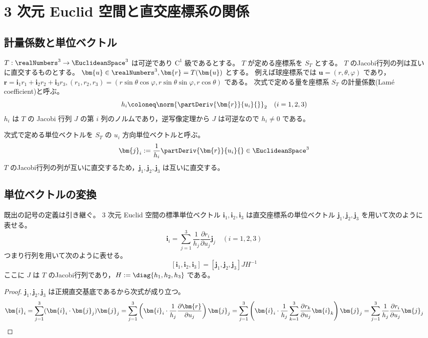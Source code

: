 \chapter{3 次元 Euclid 空間と直交座標系の関係}
    \section{計量係数と単位ベクトル}
        $T:\realNumbers^3\to\EuclideanSpace^3$ は可逆であり $\mathrm{C}^1$ 級であるとする。
        $T$ が定める座標系を $S_T$ とする。
        $T$ のJacobi行列の列は互いに直交するものとする。
        $\bm{u}\in\realNumbers^3,\bm{r} = T(\bm{u})$ とする。
        例えば球座標系では $\bm{u} = (r,\theta,\varphi)$ であり，$\bm{r} = \bm{i}_1 r_1 + \bm{i}_2 r_2 + \bm{i}_3 r_3,(r_1,r_2,r_3) = (r\sin\theta\cos\varphi,r\sin\theta\sin\varphi,r\cos\theta)$ である。
        次式で定める量を座標系 $S_T$ の計量係数(Lam\'{e} coefficient)と呼ぶ。
        \[ h_i \coloneq \norm{\partDeriv{\bm{r}}{u_i}{}}_2 \quad (i=1,2,3) \]
        $h_i$ は $T$ の Jacobi 行列 $J$ の第 $i$ 列のノルムであり，逆写像定理から $J$ は可逆なので $h_i \neq 0$ である。
        \par
        次式で定める単位ベクトルを $S_T$ の $u_i$ 方向単位ベクトルと呼ぶ。
        \[ \bm{j}_i := \frac{1}{h_i}\partDeriv{\bm{r}}{u_i}{}\in\EuclideanSpace^3 \]
        $T$ のJacobi行列の列が互いに直交するため，$\bm{j}_1,\bm{j}_2,\bm{j}_3$ は互いに直交する。
    \section{単位ベクトルの変換}
        \label{単位ベクトルの変換}
        \begin{shadebox}
            既出の記号の定義は引き継ぐ。
            3 次元 Euclid 空間の標準単位ベクトル $\bm{i}_1,\bm{i}_2,\bm{i}_3$ は直交座標系の単位ベクトル $\bm{j}_1,\bm{j}_2,\bm{j}_3$ を用いて次のように表せる。
            \[ \bm{i}_i = \sum_{j=1}^3 \frac{1}{h_j}\frac{\partial r_i}{\partial u_j}\bm{j}_j \quad (i=1,2,3) \]
            つまり行列を用いて次のように表せる。
            \[ [\bm{i}_1, \bm{i}_2, \bm{i}_3] = [\bm{j}_1, \bm{j}_2, \bm{j}_3]JH^{-1} \]
            ここに $J$ は $T$ のJacobi行列であり，$H := \diag{h_1,h_2,h_3}$ である。
        \end{shadebox}
        \begin{proof}
            \quad\par
            $\bm{j}_1,\bm{j}_2,\bm{j}_3$ は正規直交基底であるから次式が成り立つ。
            \[ \bm{i}_i = \sum_{j=1}^3 (\bm{i}_i\cdot\bm{j}_j)\bm{j}_j = \sum_{j=1}^3 \left(\bm{i}_i\cdot\frac{1}{h_j}\frac{\partial \bm{r}}{\partial u_j}\right)\bm{j}_j = \sum_{j=1}^3 \left(\bm{i}_i\cdot\frac{1}{h_j}\sum_{k=1}^3\frac{\partial r_k}{\partial u_j}\bm{i}_k\right)\bm{j}_j \\
            = \sum_{j=1}^3 \frac{1}{h_j}\frac{\partial r_i}{\partial u_j}\bm{j}_j \]
        \end{proof}
